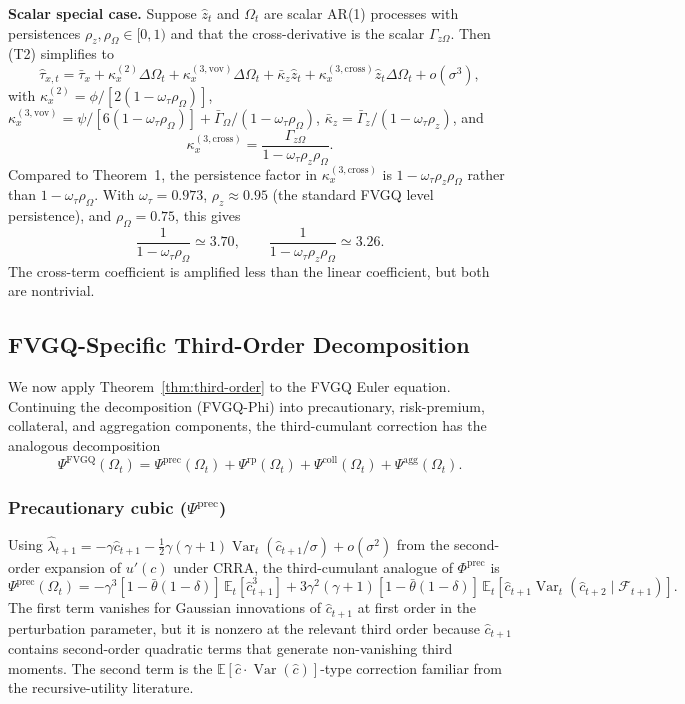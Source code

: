 \documentclass[11pt]{article}
\newcommand{\E}{\mathbb{E}}
\newcommand{\Var}{\operatorname{Var}}
\newcommand{\mc}[1]{\mathcal{#1}}
\newcommand{\kxtwo}{\kappa_x^{(2)}}
\newcommand{\kxvov}{\kappa_x^{(3,\mathrm{vov})}}
\newcommand{\kxcross}{\kappa_x^{(3,\mathrm{cross})}}
\theoremstyle{plain}
\theoremstyle{definition}
\begin{document}
\noindent\textbf{Scalar special case.} Suppose $\hat z_t$ and $\Omega_t$ are
scalar AR(1) processes with persistences $\rho_z,\rho_\Omega\in[0,1)$ and that
the cross-derivative is the scalar $\Gamma_{z\Omega}$. Then (T2) simplifies to
\begin{equation}
\hat\tau_{x,t}
= \bar\tau_x
+ \kxtwo \Delta\Omega_t
+ \kxvov \Delta\Omega_t
+ \bar\kappa_z\hat z_t
+ \kxcross \hat z_t\Delta\Omega_t
+ o(\sigma^3),
\tag{T2s}
\end{equation}
with $\kxtwo=\phi/[2(1-\omega_\tau\rho_\Omega)]$,
$\kxvov=\psi/[6(1-\omega_\tau\rho_\Omega)]+\bar\Gamma_\Omega/(1-\omega_\tau
\rho_\Omega)$, $\bar\kappa_z=\bar\Gamma_z/(1-\omega_\tau\rho_z)$, and
\[
\kxcross
= \frac{\Gamma_{z\Omega}}{1-\omega_\tau \rho_z\rho_\Omega}.
\]
Compared to Theorem~1, the persistence factor in $\kxcross$ is
$1-\omega_\tau\rho_z\rho_\Omega$ rather than $1-\omega_\tau\rho_\Omega$. With
$\omega_\tau=0.973$, $\rho_z\approx 0.95$ (the standard FVGQ level
persistence), and $\rho_\Omega=0.75$, this gives
\[
\frac{1}{1-\omega_\tau\rho_\Omega}\simeq 3.70,
\qquad
\frac{1}{1-\omega_\tau\rho_z\rho_\Omega}\simeq 3.26.
\]
The cross-term coefficient is amplified less than the linear coefficient, but
both are nontrivial.

\subsection{FVGQ-Specific Third-Order Decomposition}

We now apply Theorem~\ref{thm:third-order} to the FVGQ Euler equation.
Continuing the decomposition (FVGQ-Phi) into precautionary, risk-premium,
collateral, and aggregation components, the third-cumulant correction has the
analogous decomposition
\begin{equation}
\Psi^{\mathrm{FVGQ}}(\Omega_t)
=
\Psi^{\mathrm{prec}}(\Omega_t)
+\Psi^{\mathrm{rp}}(\Omega_t)
+\Psi^{\mathrm{coll}}(\Omega_t)
+\Psi^{\mathrm{agg}}(\Omega_t).
\tag{FVGQ-Psi}
\end{equation}

\subsubsection*{Precautionary cubic ($\Psi^{\mathrm{prec}}$)}

Using $\hat\lambda_{t+1}=-\gamma\hat c_{t+1}-\tfrac{1}{2}\gamma(\gamma+1)
\Var_t(\hat c_{t+1}/\sigma)+o(\sigma^2)$ from the second-order expansion of
$u'(c)$ under CRRA, the third-cumulant analogue of $\Phi^{\mathrm{prec}}$ is
\begin{equation}
\Psi^{\mathrm{prec}}(\Omega_t)
=
-\gamma^3[1-\bar\theta(1-\delta)]\,\E_t[\hat c_{t+1}^3]
+ 3\gamma^2(\gamma+1)[1-\bar\theta(1-\delta)]\,\E_t[\hat c_{t+1}\Var_t(\hat
c_{t+2}\mid \mc{F}_{t+1})].
\tag{Psi-Prec}
\end{equation}
The first term vanishes for Gaussian innovations of $\hat c_{t+1}$ at first
order in the perturbation parameter, but it is nonzero at the relevant third
order because $\hat c_{t+1}$ contains second-order quadratic terms that
generate non-vanishing third moments. The second term is the
$\E[\hat c \cdot \Var(\hat c)]$-type correction familiar from the
recursive-utility literature.
\end{document}
